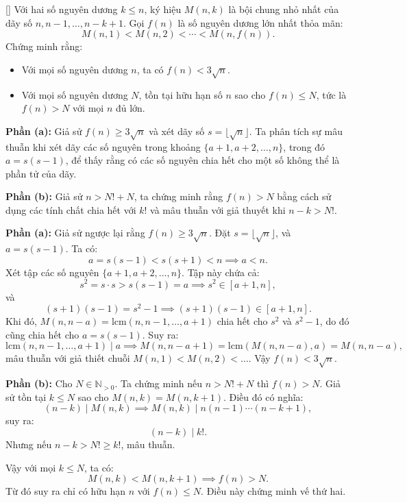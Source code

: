 \documentclass[../03-arithmetic-functions.tex]{subfiles}
\begin{document}
\begin{example*}\label{example:ROU-2015-TST-D3-P3}[\textbf{}]
    Với hai số nguyên dương \( k \leq n \), ký hiệu \( M(n,k) \) là bội chung nhỏ nhất của dãy số \( n, n-1, \dots, n - k + 1 \).  
    Gọi \( f(n) \) là số nguyên dương lớn nhất thỏa mãn:
    \[
        M(n,1) < M(n,2) < \cdots < M(n,f(n)).
    \]
    Chứng minh rằng:
    \begin{itemize}[topsep=0pt, partopsep=0pt, itemsep=0pt]
        \item Với mọi số nguyên dương \( n \), ta có \( f(n) < 3\sqrt{n} \).
        \item Với mọi số nguyên dương \( N \), tồn tại hữu hạn số \( n \) sao cho \( f(n) \leq N \), tức là \( f(n) > N \) với mọi \( n \) đủ lớn.
    \end{itemize}    
\end{example*}

\begin{story*}
    \textbf{Phần (a):} Giả sử \( f(n) \ge 3\sqrt{n} \) và xét dãy số \( s = \lfloor \sqrt{n} \rfloor \). Ta phân tích sự mâu thuẫn khi xét dãy các số nguyên trong khoảng \( \{a+1, a+2, \dots, n\} \), trong đó \( a = s(s-1) \), để thấy rằng có các số nguyên chia hết cho một số không thể là phần tử của dãy.

    \textbf{Phần (b):} Giả sử \( n > N! + N \), ta chứng minh rằng \( f(n) > N \) bằng cách sử dụng các tính chất chia hết với \( k! \) và mâu thuẫn với giả thuyết khi \( n - k > N! \).
\end{story*}

\begin{soln}
    \textbf{Phần (a):} Giả sử ngược lại rằng \( f(n) \ge 3\sqrt{n} \). Đặt \( s = \lfloor \sqrt{n} \rfloor \), và \( a = s(s - 1) \). Ta có:
    \[
        a = s(s - 1) < s(s + 1) < n \implies a < n.
    \]
    Xét tập các số nguyên \( \{a+1, a+2, \dots, n\} \). Tập này chứa cả:
    \[
        s^2 = s \cdot s > s(s-1) = a \implies s^2 \in [a+1, n],
    \]
    và
    \[
        (s+1)(s-1) = s^2 - 1 \implies (s+1)(s-1) \in [a+1, n].
    \]
    Khi đó, \( M(n, n - a) = \mathrm{lcm}(n, n-1, \dots, a+1) \) chia hết cho \( s^2 \) và \( s^2 - 1 \), do đó cũng chia hết cho \( a = s(s-1) \).  
    Suy ra:
    \[
        \mathrm{lcm}(n, n-1, \dots, a+1) \mid a \implies M(n, n - a + 1) = \mathrm{lcm}(M(n, n - a), a) = M(n, n - a),
    \]
    mâu thuẫn với giả thiết chuỗi \( M(n, 1) < M(n, 2) < \dots \). Vậy \( f(n) < 3\sqrt{n} \).
        
    \textbf{Phần (b):} Cho \( N \in \mathbb{N}_{>0} \). Ta chứng minh nếu \( n > N! + N \) thì \( f(n) > N \).  
    Giả sử tồn tại \( k \le N \) sao cho \( M(n,k) = M(n,k+1) \).  
    Điều đó có nghĩa:
    \[
        (n-k) \mid M(n,k) \implies M(n,k) \mid n(n-1)\cdots(n-k+1),
    \]
    suy ra:
    \[
        (n-k) \mid k!.
    \]
    Nhưng nếu \( n-k > N! \ge k! \), mâu thuẫn.  
    
    Vậy với mọi \( k \le N \), ta có:
    \[
        M(n,k) < M(n,k+1) \implies f(n) > N.
    \]
    Từ đó suy ra chỉ có hữu hạn \( n \) với \( f(n) \le N \). Điều này chứng minh vế thứ hai.
\end{soln}

\end{document}
